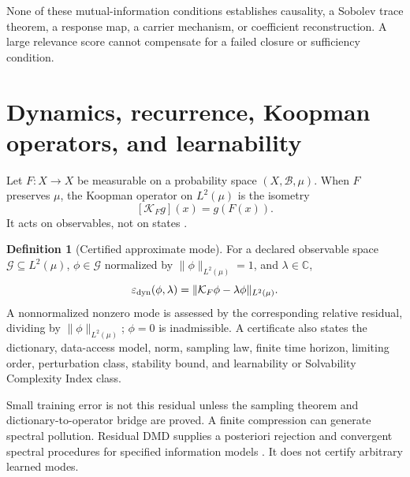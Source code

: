 \documentclass[11pt,a4paper]{article}
\theoremstyle{definition}
\newtheorem{definition}{Definition}[section]
\theoremstyle{plain}
\theoremstyle{remark}
\begin{document}
None of these mutual-information conditions establishes causality, a Sobolev
trace theorem, a response map, a carrier mechanism, or coefficient
reconstruction.  A large relevance score cannot compensate for a failed
closure or sufficiency condition.

\section{Dynamics, recurrence, Koopman operators, and learnability}
\label{sec:koopman}

Let \(F:X\to X\) be measurable on a probability space
\((X,\mathcal B,\mu)\).  When \(F\) preserves \(\mu\), the Koopman operator on
\(L^2(\mu)\) is the isometry
\begin{equation}\label{eq:koopman}
[\mathcal K_Fg](x)=g(F(x)).
\end{equation}
It acts on observables, not on states \citep{koopman1931}.

\begin{definition}[Certified approximate mode]\label{def:koopmode}
For a declared observable space \(\mathcal G\subseteq L^2(\mu)\),
\(\phi\in\mathcal G\) normalized by \(\|\phi\|_{L^2(\mu)}=1\), and
\(\lambda\in\mathbb C\),
\[
\varepsilon_{\rm dyn}(\phi,\lambda)
=\|\mathcal K_F\phi-\lambda\phi\|_{L^2(\mu)}.
\]
A nonnormalized nonzero mode is assessed by the corresponding relative
residual, dividing by \(\|\phi\|_{L^2(\mu)}\); \(\phi=0\) is inadmissible.
A certificate also states the dictionary, data-access model, norm, sampling
law, finite time horizon, limiting order, perturbation class, stability bound,
and learnability or Solvability Complexity Index class.
\end{definition}

Small training error is not this residual unless the sampling theorem and
dictionary-to-operator bridge are proved.  A finite compression can generate
spectral pollution.  Residual DMD supplies a posteriori rejection and
convergent spectral procedures for specified information models
\citep{colbrooktownsend2024,colbrookayton2023}.  It does not certify arbitrary
learned modes.
\end{document}
